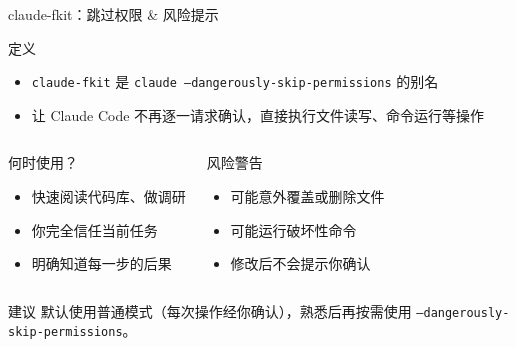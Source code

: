 \documentclass[aspectratio=169]{ctexbeamer}
\begin{document}
\begin{frame}{claude-fkit：跳过权限 \& 风险提示}
\small

\begin{block}{定义}
\begin{itemize}
  \item \texttt{claude-fkit} 是 \texttt{claude --dangerously-skip-permissions} 的别名
  \item 让 Claude Code \alert{不再逐一请求确认}，直接执行文件读写、命令运行等操作
\end{itemize}
\end{block}

\vspace{0.3cm}

\begin{columns}[T]
\begin{exampleblock}{何时使用？}
\begin{itemize}
  \setlength\itemsep{4pt}
  \item 快速阅读代码库、做调研
  \item 你完全信任当前任务
  \item 明确知道每一步的后果
\end{itemize}
\end{exampleblock}

\begin{alertblock}{风险警告}
\begin{itemize}
  \setlength\itemsep{4pt}
  \item 可能意外\alert{覆盖或删除}文件
  \item 可能运行破坏性命令
  \item 修改后不会提示你确认
\end{itemize}
\end{alertblock}
\end{columns}

\begin{block}{建议}
\centering
默认使用普通模式（每次操作经你确认），熟悉后再按需使用 \texttt{--dangerously-skip-permissions}。
\end{block}

\end{frame}
\end{document}
